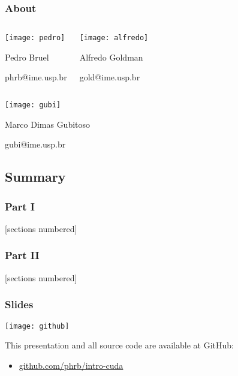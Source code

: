 \documentclass[10pt, compress]{beamer}
\begin{document}
\begin{frame}
    \frametitle{About}
    \footnotesize
    \begin{columns}[T,onlytextwidth]
        \begin{center}
            \texttt{[image: pedro]}

            Pedro Bruel

            \alert{phrb}@ime.usp.br
        \end{center}

        \begin{center}
            \texttt{[image: alfredo]}

            Alfredo Goldman

            \alert{gold}@ime.usp.br
        \end{center}

    \end{columns}

    \begin{center}
        \texttt{[image: gubi]}

        Marco Dimas Gubitoso

        \alert{gubi}@ime.usp.br
    \end{center}
\end{frame}

\subsection{Summary}

\begin{frame}
    \frametitle{Part I}
    [sections numbered]
    \tableofcontents[hideallsubsections, part=1]
\end{frame}

\begin{frame}
    \frametitle{Part II}
    [sections numbered]
    \tableofcontents[hideallsubsections, part=2]
\end{frame}

\begin{frame}
    \frametitle{Slides}
    \begin{center}
        \texttt{[image: github]}
    \end{center}
    This presentation and all source code are available
    at \alert{GitHub}:

    \begin{itemize}
        \item \url{github.com/phrb/intro-cuda}
    \end{itemize}
\end{frame}
\end{document}
